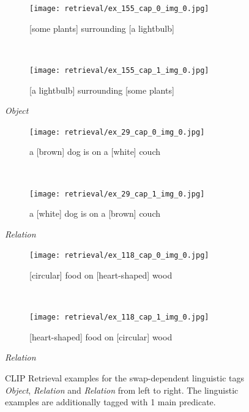 \begin{figure}[ht]
\centering
    \begin{minipage}[t]{.30\textwidth}
        \begin{subfigure}[t]{\textwidth}
        \centering
        \texttt{[image: retrieval/ex\_155\_cap\_0\_img\_0.jpg]}
        \caption{[some plants] surrounding [a lightbulb]}
        \end{subfigure}\\
        \begin{subfigure}[t]{\textwidth}
        \centering
        \texttt{[image: retrieval/ex\_155\_cap\_1\_img\_0.jpg]}
        \caption{[a lightbulb] surrounding [some plants]}
        \end{subfigure}%
        \caption*{\textit{Object}}
    \end{minipage}
    \hfill
    \begin{minipage}[t]{.30\textwidth}
        \begin{subfigure}[t]{\textwidth}
        \centering
        \texttt{[image: retrieval/ex\_29\_cap\_0\_img\_0.jpg]}
        \caption{a [brown] dog is on a [white] couch}
        \end{subfigure}\\
        \vspace{9pt}
        \begin{subfigure}[t]{\textwidth}
        \centering
        \texttt{[image: retrieval/ex\_29\_cap\_1\_img\_0.jpg]}
        \caption{a [white] dog is on a [brown] couch}
        \end{subfigure}%
        \caption*{\textit{Relation}}
    \end{minipage}
    \hfill
    \begin{minipage}[t]{.30\textwidth}
        \begin{subfigure}[t]{\textwidth}
        \centering
        \texttt{[image: retrieval/ex\_118\_cap\_0\_img\_0.jpg]}
        \caption{[circular] food on [heart-shaped] wood}
        \end{subfigure}\\
        \begin{subfigure}[t]{\textwidth}
        \centering
        \texttt{[image: retrieval/ex\_118\_cap\_1\_img\_0.jpg]}
        \caption{[heart-shaped] food on [circular] wood}
        \end{subfigure}%
        \caption*{\textit{Relation}}
    \end{minipage}%
    \caption{CLIP Retrieval examples for the swap-dependent linguistic tags \textit{Object}, \textit{Relation} and \textit{Relation} from left to right. The linguistic examples are additionally tagged with 1 main predicate.}
    \label{fig:retrieval-examples}
\end{figure}

